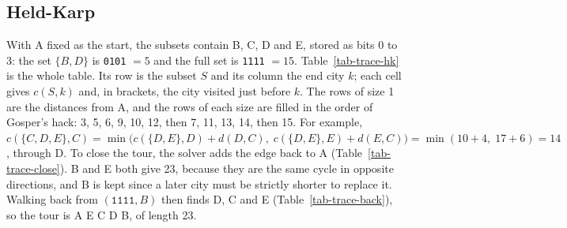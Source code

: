 \documentclass[10pt,a4paper]{article}
\begin{document}
\subsection{Held-Karp}

With A fixed as the start, the subsets contain B, C, D and E, stored as bits 0 to 3: the set $\{B, D\}$ is \texttt{0101} $= 5$ and the full set is \texttt{1111} $= 15$. Table~\ref{tab-trace-hk} is the whole table. Its row is the subset $S$ and its column the end city $k$; each cell gives $c(S,k)$ and, in brackets, the city visited just before $k$. The rows of size 1 are the distances from A, and the rows of each size are filled in the order of Gosper's hack: 3, 5, 6, 9, 10, 12, then 7, 11, 13, 14, then 15. For example,
$c(\{C,D,E\}, C) = \min\big(c(\{D,E\}, D) + d(D,C),\; c(\{D,E\}, E) + d(E,C)\big) = \min(10 + 4,\; 17 + 6) = 14$, through D.
To close the tour, the solver adds the edge back to A (Table~\ref{tab-trace-close}). B and E both give 23, because they are the same cycle in opposite directions, and B is kept since a later city must be strictly shorter to replace it. Walking back from $(\texttt{1111}, B)$ then finds D, C and E (Table~\ref{tab-trace-back}), so the tour is A E C D B, of length 23.
\end{document}
